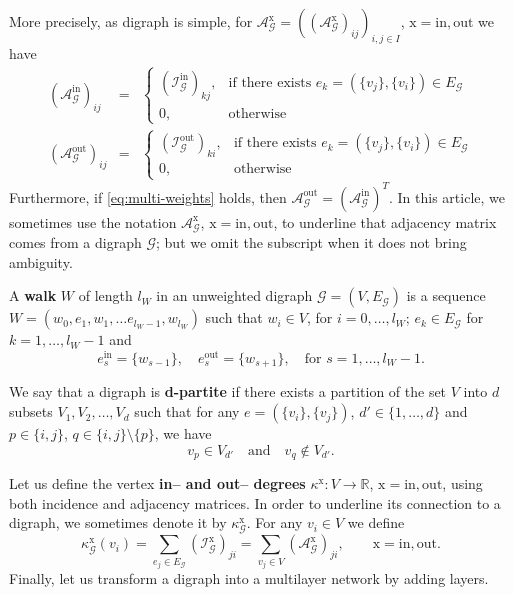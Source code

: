 \documentclass[a4paper,12pt]{article}
\theoremstyle{definition}
\theoremstyle{remark}
\newcommand{\mG}{\mathcal{G}}
\newcommand{\EG}{E_{\mathcal{G}}}
\newcommand{\tin}{\mathrm{in}}
\newcommand{\out}{\mathrm{out}}
\newcommand{\inci}{\mathcal{I}^{\tin}}
\newcommand{\inco}{\mathcal{I}^{\out}}
\begin{document}
More precisely, as digraph is simple, for $\mathcal{A}_{\mG}^{\textrm{x}}=((\mathcal{A}_{\mG}^{\textrm{x}})_{ij})_{i,j\in I}$, $\textrm{x}=\textrm{in},\textrm{out}$ we have
 \begin{eqnarray}\label{eq:adjacency-in}
(\mathcal{A}^{\tin}_{\mG})_{ij}&=&\left\{\begin{array}{cc}
(\inci_{\mG})_{kj}, &\text{if there exists } e_k=(\{v_j\}, \{v_i\})\in \EG\\
0,&\text{otherwise}\end{array}\right.\\ \label{eq:adjacency-out}
(\mathcal{A}^{\out}_{\mG})_{ij}&=&\left\{\begin{array}{cc}
(\inco_{\mG})_{ki}, &\text{if there exists }e_k=(\{v_{j}\}, \{v_{i}\})\in \EG\\
0, &\text{otherwise}\end{array}\right. 
\end{eqnarray}
Furthermore, if \eqref{eq:multi-weights} holds, then $\mathcal{A}_{\mG}^{\textrm{out}}=\left(\mathcal{A}_{\mG}^{\textrm{in}}\right)^T$. In this article, we sometimes use the notation $\mathcal{A}^{\textrm{x}}_{\mG}$, $\textrm{x}=\textrm{in},\textrm{out}$, to underline that adjacency matrix comes from a digraph $\mG$; but we omit the subscript when it does not bring ambiguity.

A \textbf{walk} $W$ of length $l_{W}$ in an unweighted digraph $\mG=(V,\EG)$ is a sequence $W=(w_0,e_1,w_1,\ldots e_{l_W-1},w_{l_{W}})$ such that $w_i\in V$, for $i=0,\ldots,l_{W}$; $e_k\in E_{\mG}$ for $k=1,\ldots,l_W-1$ and 
    \begin{equation*}
e_{s}^{\tin}=\{w_{s-1}\},\quad e_{s}^{\out}=\{w_{s+1}\},\quad \text{for }s=1,\ldots,l_W-1.
\end{equation*}

We say that a digraph is \textbf{d-partite} if there exists a partition of the set $V$ into $d$ subsets $V_1, V_2, \ldots, V_d$ such that for any $e=(\{v_i\},\{v_j\})$, $d'\in \{1,\ldots,d\}$ and $p\in \{i,j\}$, $q\in \{i,j\}\setminus \{p\}$, we have
\begin{equation}\label{partition}
v_p\in V_{d'}\quad \textrm{and} \quad v_q\notin V_{d'}.
\end{equation}

 Let us define the vertex \textbf{in-- and out-- degrees} $\kappa^{\textrm{x}}:V\to \mathbb{R}$, $\mathrm{x}=\mathrm{in},\mathrm{out}$, using both incidence and adjacency matrices. In order to underline its connection to a digraph, we sometimes denote it by $\kappa_{\mG}^{\textrm{x}}$. For any $v_i\in V$ we define
\begin{equation}\label{eq:degree}
\kappa^{\textrm{x}}_{\mG}(v_i)=\sum_{e_j\in E_{\mG}}(\mathcal{I}_{\mG}^{\textrm{x}})_{ji}=\sum_{v_j\in V}(\mathcal{A}^{\textrm{x}}_{\mG})_{ji},\qquad \mathrm{x}=\mathrm{in},\mathrm{out}.
\end{equation}
Finally, let us transform a digraph into a multilayer network by adding layers.
\end{document}
